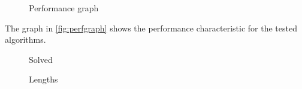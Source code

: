 \begin{figure}
	\centering
	
	\caption{Performance graph}
	\label{fig:perfgraph}
\end{figure}

The graph in \autoref{fig:perfgraph} shows the performance characteristic for
the tested algorithms.

\begin{figure}
	\centering
	
	\caption{Solved}
	\label{fig:solved}
\end{figure}

\begin{figure}
	\centering
	
	\caption{Lengths}
	\label{fig:lengths}
\end{figure}